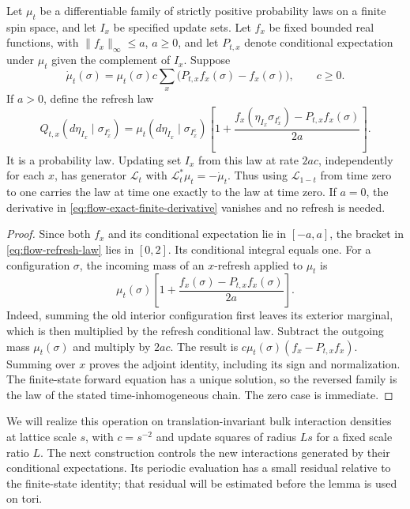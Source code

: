 \begin{lemma}\label{lem:flow-reverse}
Let \(\mu_t\) be a differentiable family of strictly positive probability
laws on a finite spin space, and let \(I_x\) be specified update sets.
Let \(f_x\) be fixed bounded real functions, with
\(\|f_x\|_\infty\le a\), \(a\ge0\), and let \(P_{t,x}\) denote conditional
expectation under \(\mu_t\) given the complement of \(I_x\).  Suppose
\begin{equation}\label{eq:flow-exact-finite-derivative}
 \dot\mu_t(\sigma)=\mu_t(\sigma)c
 \sum_x\bigl(P_{t,x}f_x(\sigma)-f_x(\sigma)\bigr),
 \qquad c\ge0.
\end{equation}
If \(a>0\), define the refresh law
\begin{equation}\label{eq:flow-refresh-law}
 Q_{t,x}(d\eta_{I_x}\mid\sigma_{I_x^c})
 =\mu_t(d\eta_{I_x}\mid\sigma_{I_x^c})
 \left[1+\frac{f_x(\eta_{I_x}\sigma_{I_x^c})
                  -P_{t,x}f_x(\sigma)}{2a}\right].
\end{equation}
It is a probability law.  Updating set \(I_x\) from this law at rate
\(2ac\), independently for each \(x\), has generator \(\mathcal L_t\)
with
\(\mathcal L_t^*\mu_t=-\dot\mu_t\).  Thus using \(\mathcal L_{1-t}\)
from time zero to one carries the law at time one exactly to the law at
time zero.
If \(a=0\), the derivative in
\eqref{eq:flow-exact-finite-derivative} vanishes and no refresh is needed.
\end{lemma}

\begin{proof}
Since both \(f_x\) and its conditional expectation lie in \([-a,a]\),
the bracket in \eqref{eq:flow-refresh-law} lies in \([0,2]\).
Its conditional integral equals one.  For a configuration \(\sigma\),
the incoming mass of an \(x\)-refresh applied to \(\mu_t\) is
\[
 \mu_t(\sigma)\left[1+
 \frac{f_x(\sigma)-P_{t,x}f_x(\sigma)}{2a}\right].
\]
Indeed, summing the old interior configuration first leaves its exterior
marginal, which is then multiplied by the refresh conditional law.
Subtract the outgoing mass \(\mu_t(\sigma)\) and multiply by \(2ac\).
The result is
\(c\mu_t(\sigma)(f_x-P_{t,x}f_x)\).  Summing over \(x\) proves the
adjoint identity, including its sign and normalization.  The finite-state
forward equation has a unique solution, so the reversed family is the
law of the stated time-inhomogeneous chain.  The zero case is immediate.
\end{proof}

We will realize this operation on translation-invariant bulk interaction
densities at lattice scale $s$, with $c=s^{-2}$ and update squares of
radius $Ls$ for a fixed scale ratio $L$.
The next construction controls the new interactions generated by their
conditional expectations.  Its periodic evaluation has a small residual
relative to the finite-state identity; that residual will be estimated
before the lemma is used on tori.

